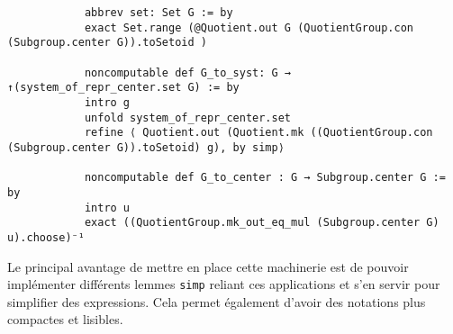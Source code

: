 \documentclass[10pt]{article}
\theoremstyle{definition}
\begin{document}
\begin{center}
	\begin{tcolorbox}[title = $L\exists\forall N$,width=12cm,text width=12cm,colback=lightgray!30,
		colframe=gray,sharp corners,
		rounded corners=uphill ]
		\begin{lstlisting}
			abbrev set: Set G := by
			exact Set.range (@Quotient.out G (QuotientGroup.con (Subgroup.center G)).toSetoid )
			
			noncomputable def G_to_syst: G → ↑(system_of_repr_center.set G) := by
			intro g
			unfold system_of_repr_center.set
			refine ⟨ Quotient.out (Quotient.mk ((QuotientGroup.con (Subgroup.center G)).toSetoid) g), by simp⟩
			
			noncomputable def G_to_center : G → Subgroup.center G := by
			intro u
			exact ((QuotientGroup.mk_out_eq_mul (Subgroup.center G) u).choose)⁻¹
		\end{lstlisting}
	\end{tcolorbox}
\end{center}
Le principal avantage de mettre en place cette machinerie est de pouvoir implémenter différents lemmes \lstinline|simp| reliant ces applications et s'en servir pour simplifier des expressions. Cela permet également d'avoir des notations plus compactes et lisibles.
\newline
\end{document}

